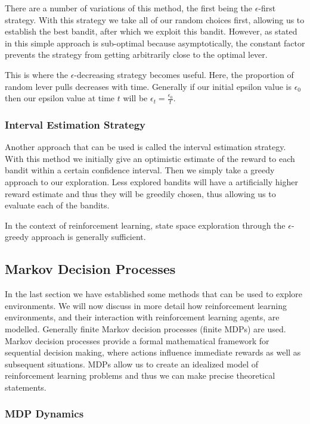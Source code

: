 There are a number of variations of this method, the first being the $\epsilon$-first strategy.
With this strategy we take all of our random choices first, allowing us to establish the best bandit,
after which we exploit this bandit.
However, as stated in\citep{vermorel2005multi} this simple approach is sub-optimal because asymptotically,
the constant factor prevents the strategy from getting arbitrarily close to
the optimal lever.

This is where the $\epsilon$-decreasing strategy becomes useful.
Here, the proportion of random lever pulls decreases with time.
Generally if our initial epsilon value is $\epsilon_0$ then our epsilon value at time $t$ will be
$\epsilon_t = \frac{\epsilon_0}{t}$.

\subsubsection{Interval Estimation Strategy}
Another approach that can be used is called the interval estimation strategy.
With this method we initially give an optimistic estimate of the reward to each bandit within a certain
confidence interval.
Then we simply take a greedy approach to our exploration.
Less explored bandits will have a artificially higher reward estimate and thus they will be greedily chosen,
thus allowing us to evaluate each of the bandits.

In the context of reinforcement learning, state space exploration through the $\epsilon$-greedy approach is
generally sufficient.

\subsection{Markov Decision Processes}\label{subsec:mdp}
In the last section we have established some methods that can be used to explore environments.
We will now discuss in more detail how reinforcement learning environments, and their interaction
with reinforcement learning agents, are modelled.
Generally finite Markov decision processes (finite MDPs) are used.
Markov decision processes provide a formal mathematical framework for sequential decision making,
where actions influence immediate rewards as well as subsequent situations\citep{sutton1998reinforcement}.
MDPs allow us to create an idealized model of reinforcement learning problems and thus we can make precise
theoretical statements.

\subsubsection{MDP Dynamics}

